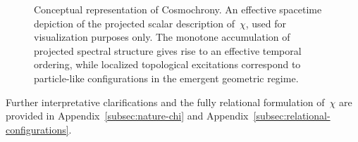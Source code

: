   \begin{figure}[h]
    \centering
    \caption{Conceptual representation of Cosmochrony.
    An effective spacetime depiction of the projected scalar description
    of~$\chi$, used for visualization purposes only.
    The monotone accumulation of projected spectral structure gives rise
    to an effective temporal ordering, while localized topological excitations
    correspond to particle-like configurations in the emergent geometric regime.}
    \label{fig:chi_concept}
  \end{figure}

  Further interpretative clarifications and the fully relational formulation
  of~$\chi$ are provided in
  Appendix~\ref{subsec:nature-chi} and
  Appendix~\ref{subsec:relational-configurations}.
